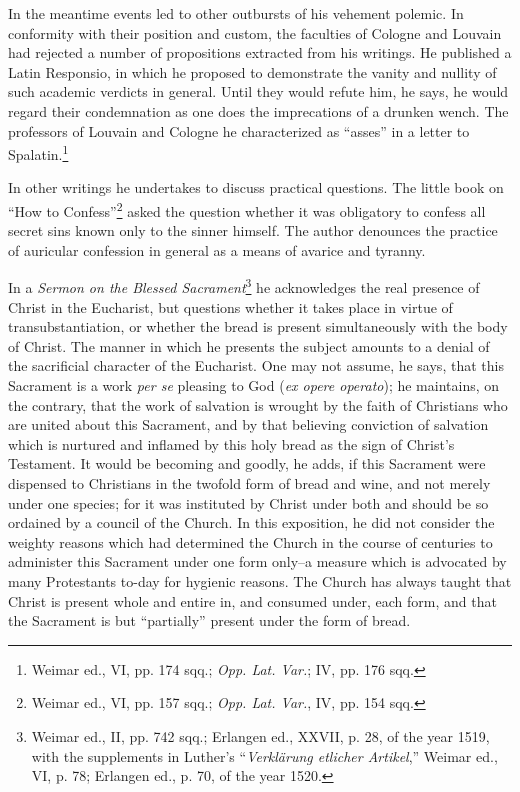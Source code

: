 In the meantime events led to other outbursts of his vehement
polemic. In conformity with their position and custom, the faculties
of Cologne and Louvain had rejected a number of propositions extracted
from his writings. He published a Latin Responsio, in which
he proposed to demonstrate the vanity and nullity of such academic
verdicts in general. Until they would refute him, he says, he would
regard their condemnation as one does the imprecations of a drunken
wench. The professors of Louvain and Cologne he characterized as
“asses” in a letter to Spalatin.\footnote{Weimar ed., VI, pp. 174 sqq.; \textit{Opp. Lat. Var.}; IV, pp. 176 sqq.}

In other writings he undertakes to discuss practical questions. The
little book on “How to Confess”\footnote{Weimar ed., VI, pp. 157 sqq.; \textit{Opp. Lat. Var.}, IV, pp. 154 sqq.}
asked the question whether it
was obligatory to confess all secret sins known only to the sinner
himself. The author denounces the practice of auricular confession
in general as a means of avarice and tyranny.

In a \textit{Sermon on the Blessed Sacrament}\footnote
{Weimar ed., II, pp. 742 sqq.; Erlangen ed., XXVII, p. 28, of the year 1519, with
the supplements in Luther’s “\textit{Verklärung etlicher Artikel},” Weimar ed., VI, p. 78;
Erlangen ed., p. 70, of the year 1520.}
he acknowledges the real
presence of Christ in the Eucharist, but questions whether it takes
place in virtue of transubstantiation, or whether the bread is present
simultaneously with the body of Christ. The manner in which he presents
the subject amounts to a denial of the sacrificial character of
the Eucharist. One may not assume, he says, that this Sacrament
is a work \textit{per se} pleasing to God (\textit{ex opere operato}); he maintains,
on the contrary, that the work of salvation is wrought by the faith
of Christians who are united about this Sacrament, and by that believing
conviction of salvation which is nurtured and inflamed by
this holy bread as the sign of Christ’s Testament. It would be becoming
and goodly, he adds, if this Sacrament were dispensed to
Christians in the twofold form of bread and wine, and not merely
under one species; for it was instituted by Christ under both and
should be so ordained by a council of the Church. In this exposition,
he did not consider the weighty reasons which had determined the
Church in the course of centuries to administer this Sacrament under
one form only--a measure which is advocated by many Protestants
to-day for hygienic reasons. The Church has always taught that
Christ is present whole and entire in, and consumed under, each form,
and that the Sacrament is but “partially” present under the form
of bread.

